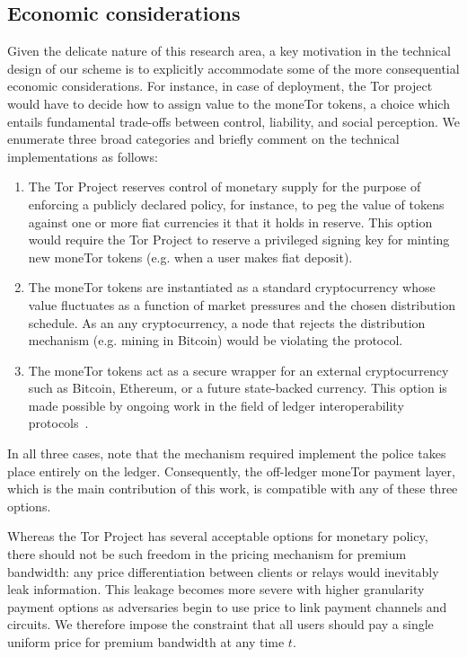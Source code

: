 \subsection{Economic considerations}

Given the delicate nature of this research area, a key motivation in the technical design of our scheme is to explicitly accommodate some of the more consequential economic considerations.
For instance, in case of deployment, the Tor project would have to decide how to assign value to the moneTor tokens, a choice which entails fundamental trade-offs between control, liability, and social perception.
We enumerate three broad categories and briefly comment on the technical implementations as follows:

\begin{enumerate}

\item The Tor Project reserves control of monetary supply for the purpose of enforcing a publicly declared policy, for instance, to peg the value of tokens against one or more fiat currencies it that it holds in reserve.
This option would require the Tor Project to reserve a privileged signing key for minting new moneTor tokens (e.g.
when a user makes fiat deposit).
\item The moneTor tokens are instantiated as a standard cryptocurrency whose value fluctuates as a function of market pressures and the chosen distribution schedule.
As an any cryptocurrency, a node that rejects the distribution mechanism (e.g.
mining in Bitcoin) would be violating the protocol.
\item The moneTor tokens act as a secure wrapper for an external cryptocurrency such as Bitcoin, Ethereum, or a future state-backed currency.
This option is made possible by ongoing work in the field of ledger interoperability protocols~\cite{back2014enabling,poon2017plasma}.

\end{enumerate}

In all three cases, note that the mechanism required implement the police takes place entirely on the ledger.
Consequently, the off-ledger moneTor payment layer, which is the main contribution of this work, is compatible with any of these three options. 

Whereas the Tor Project has several acceptable options for monetary policy, there should not be such freedom in the pricing mechanism for premium bandwidth: any price differentiation between clients or relays would inevitably leak information.
This leakage becomes more severe with higher granularity payment options as adversaries begin to use price to link payment channels and circuits.
We therefore impose the constraint that all users should pay a single uniform price for premium bandwidth at any time $t$.

